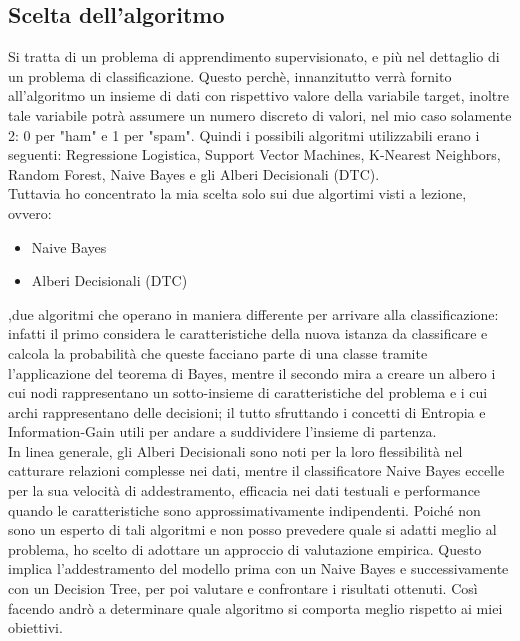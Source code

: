 \documentclass[]{article}
\begin{document}
            \subsection{Scelta dell'algoritmo}
                Si tratta di un problema di apprendimento supervisionato, e più nel dettaglio di un problema di classificazione. Questo perchè, innanzitutto verrà fornito all'algoritmo un insieme di dati con rispettivo valore della variabile target, inoltre tale variabile potrà assumere un numero discreto di valori, nel mio caso solamente 2: 0 per "ham" e 1 per "spam". Quindi i possibili algoritmi utilizzabili erano i seguenti: Regressione Logistica, Support Vector Machines, K-Nearest Neighbors, Random Forest, Naive Bayes e gli Alberi Decisionali (DTC).\\
                Tuttavia ho concentrato la mia scelta solo sui due algortimi visti a lezione, ovvero:
                \begin{itemize}
                    \item Naive Bayes
                    \item Alberi Decisionali (DTC)
                \end{itemize}
                ,due algoritmi che operano in maniera differente per arrivare alla classificazione: infatti il primo considera le caratteristiche della nuova istanza da classificare e calcola la probabilità che queste facciano parte di una classe tramite l’applicazione del teorema di Bayes, mentre il secondo mira a creare un albero i cui nodi rappresentano un sotto-insieme di caratteristiche del problema e i cui archi rappresentano delle decisioni; il tutto sfruttando i concetti di Entropia e Information-Gain utili per andare a suddividere l'insieme di partenza.\\
                In linea generale, gli Alberi Decisionali sono noti per la loro flessibilità nel catturare relazioni complesse nei dati, mentre il classificatore Naive Bayes eccelle per la sua velocità di addestramento, efficacia nei dati testuali e performance quando le caratteristiche sono approssimativamente indipendenti. Poiché non sono un esperto di tali algoritmi e non posso prevedere quale si adatti meglio al problema, ho scelto di adottare un approccio di valutazione empirica. Questo implica l'addestramento del modello prima con un Naive Bayes e successivamente con un Decision Tree, per poi valutare e confrontare i risultati ottenuti. Così facendo andrò a determinare quale algoritmo si comporta meglio rispetto ai miei obiettivi.
\end{document}

